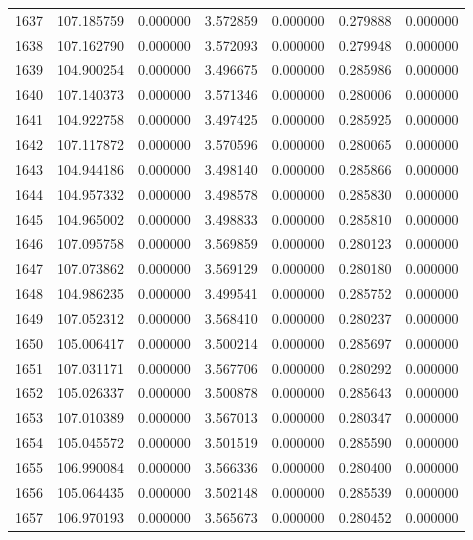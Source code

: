 \begin{tabular}{rrrrrrr}
1637 & 107.185759 &    0.000000 &  3.572859 &    0.000000 &    0.279888 &  0.000000 \\
1638 & 107.162790 &    0.000000 &  3.572093 &    0.000000 &    0.279948 &  0.000000 \\
1639 & 104.900254 &    0.000000 &  3.496675 &    0.000000 &    0.285986 &  0.000000 \\
1640 & 107.140373 &    0.000000 &  3.571346 &    0.000000 &    0.280006 &  0.000000 \\
1641 & 104.922758 &    0.000000 &  3.497425 &    0.000000 &    0.285925 &  0.000000 \\
1642 & 107.117872 &    0.000000 &  3.570596 &    0.000000 &    0.280065 &  0.000000 \\
1643 & 104.944186 &    0.000000 &  3.498140 &    0.000000 &    0.285866 &  0.000000 \\
1644 & 104.957332 &    0.000000 &  3.498578 &    0.000000 &    0.285830 &  0.000000 \\
1645 & 104.965002 &    0.000000 &  3.498833 &    0.000000 &    0.285810 &  0.000000 \\
1646 & 107.095758 &    0.000000 &  3.569859 &    0.000000 &    0.280123 &  0.000000 \\
1647 & 107.073862 &    0.000000 &  3.569129 &    0.000000 &    0.280180 &  0.000000 \\
1648 & 104.986235 &    0.000000 &  3.499541 &    0.000000 &    0.285752 &  0.000000 \\
1649 & 107.052312 &    0.000000 &  3.568410 &    0.000000 &    0.280237 &  0.000000 \\
1650 & 105.006417 &    0.000000 &  3.500214 &    0.000000 &    0.285697 &  0.000000 \\
1651 & 107.031171 &    0.000000 &  3.567706 &    0.000000 &    0.280292 &  0.000000 \\
1652 & 105.026337 &    0.000000 &  3.500878 &    0.000000 &    0.285643 &  0.000000 \\
1653 & 107.010389 &    0.000000 &  3.567013 &    0.000000 &    0.280347 &  0.000000 \\
1654 & 105.045572 &    0.000000 &  3.501519 &    0.000000 &    0.285590 &  0.000000 \\
1655 & 106.990084 &    0.000000 &  3.566336 &    0.000000 &    0.280400 &  0.000000 \\
1656 & 105.064435 &    0.000000 &  3.502148 &    0.000000 &    0.285539 &  0.000000 \\
1657 & 106.970193 &    0.000000 &  3.565673 &    0.000000 &    0.280452 &  0.000000 \\

\end{tabular}
